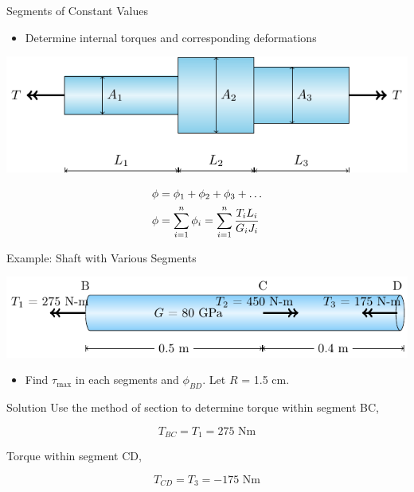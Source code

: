 \documentclass[10pt, svgnames]{beamer}
\begin{document}
\begin{frame}[label={sec:org3c93b5e}]{Segments of Constant Values}
\begin{itemize}
\item Determine internal torques and corresponding deformations
\end{itemize}

\begin{center}
\includegraphics[width=.9\linewidth]{pictures/segments-constant-values.pdf}
\end{center}

\begin{gather*}
  \phi  = {\phi _1} + {\phi _2} + {\phi _3} +  \ldots  \hfill \\
  \phi  = \sum\limits_{i = 1}^n {{\phi _i} = \sum\limits_{i = 1}^n \dfrac{T_iL_i}{G_i J_i} }  \hfill \\
\end{gather*}
\end{frame}

\begin{frame}[label={sec:org9a8fa9e}]{Example: Shaft with Various Segments}
\begin{center}
\includegraphics[width=.9\linewidth]{pictures/segments-example.pdf}
\end{center}

\begin{itemize}
\item Find \(\tau_{\max}\) in each segments and \(\phi_{BD}\). Let \(R\) =
1.5 cm.
\end{itemize}
\end{frame}

\begin{frame}[label={sec:orgf88f28c}]{Solution}
Use the method of section to determine torque within segment BC,

\[T_{BC} =  T_1 =  275\text{ Nm}\]

Torque within segment CD,

\[T_{CD} =  T_3 = -175\text{ Nm}\]
\end{frame}
\end{document}
